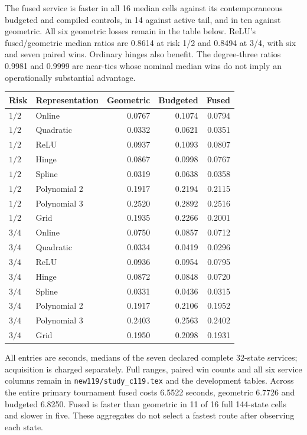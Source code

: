 The fused service is faster in all 16 median cells against its contemporaneous budgeted and compiled controls, in 14 against active tail, and in ten against geometric. All six geometric losses remain in the table below. ReLU's fused/geometric median ratios are 0.8614 at risk 1/2 and 0.8494 at 3/4, with six and seven paired wins. Ordinary hinges also benefit. The degree-three ratios 0.9981 and 0.9999 are near-ties whose nominal median wins do not imply an operationally substantial advantage.

\begin{longtable}[]{@{}llrrr@{}}
\toprule\noalign{}
Risk & {\small Representation} & Geometric & Budgeted & Fused \\
\midrule\noalign{}
\endhead
\bottomrule\noalign{}
\endlastfoot
\(1/2\) & Online & 0.0767 & 0.1074 & 0.0794 \\
\(1/2\) & Quadratic & 0.0332 & 0.0621 & 0.0351 \\
\(1/2\) & ReLU & 0.0937 & 0.1093 & 0.0807 \\
\(1/2\) & Hinge & 0.0867 & 0.0998 & 0.0767 \\
\(1/2\) & Spline & 0.0319 & 0.0638 & 0.0358 \\
\(1/2\) & Polynomial 2 & 0.1917 & 0.2194 & 0.2115 \\
\(1/2\) & Polynomial 3 & 0.2520 & 0.2892 & 0.2516 \\
\(1/2\) & Grid & 0.1935 & 0.2266 & 0.2001 \\
\(3/4\) & Online & 0.0750 & 0.0857 & 0.0712 \\
\(3/4\) & Quadratic & 0.0334 & 0.0419 & 0.0296 \\
\(3/4\) & ReLU & 0.0936 & 0.0954 & 0.0795 \\
\(3/4\) & Hinge & 0.0872 & 0.0848 & 0.0720 \\
\(3/4\) & Spline & 0.0331 & 0.0436 & 0.0315 \\
\(3/4\) & Polynomial 2 & 0.1917 & 0.2106 & 0.1952 \\
\(3/4\) & Polynomial 3 & 0.2403 & 0.2563 & 0.2402 \\
\(3/4\) & Grid & 0.1950 & 0.2098 & 0.1931 \\
\end{longtable}

All entries are seconds, medians of the seven declared complete 32-state services; acquisition is charged separately. Full ranges, paired win counts and all six service columns remain in \nolinkurl{new119/study_c119.tex} and the development tables. Across the entire primary tournament fused costs 6.5522 seconds, geometric 6.7726 and budgeted 6.8250. Fused is faster than geometric in 11 of 16 full 144-state cells and slower in five. These aggregates do not select a fastest route after observing each state.

